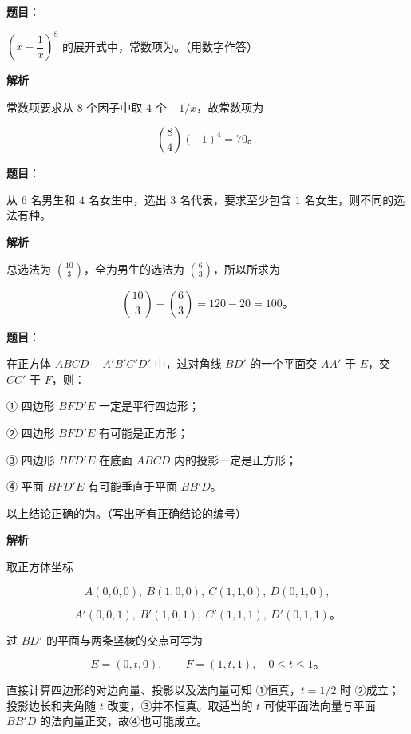 \begin{answer}

\textbf{题目}：

$\left(x-\dfrac1x\right)^8$ 的展开式中，常数项为\gkblank{}。（用数字作答）

\textbf{解析}

常数项要求从 $8$ 个因子中取 $4$ 个 $-1/x$，故常数项为

\nopagebreak[4]
\[
\binom84(-1)^4=70\text{。}
\]


\end{answer}
\begin{answer}

\textbf{题目}：

从 $6$ 名男生和 $4$ 名女生中，选出 $3$ 名代表，要求至少包含 $1$ 名女生，则不同的选法有\gkblank{}种。

\textbf{解析}

总选法为 $\binom{10}{3}$，全为男生的选法为 $\binom63$，所以所求为

\nopagebreak[4]
\[
\binom{10}{3}-\binom63=120-20=100\text{。}
\]


\end{answer}
\begin{answer}

\textbf{题目}：

在正方体 $ABCD-A'B'C'D'$ 中，过对角线 $BD'$ 的一个平面交 $AA'$ 于 $E$，交 $CC'$ 于 $F$，则：

① 四边形 $BFD'E$ 一定是平行四边形；

② 四边形 $BFD'E$ 有可能是正方形；

③ 四边形 $BFD'E$ 在底面 $ABCD$ 内的投影一定是正方形；

④ 平面 $BFD'E$ 有可能垂直于平面 $BB'D$。

以上结论正确的为\gkblank{}。（写出所有正确结论的编号）

\textbf{解析}

取正方体坐标

\nopagebreak[4]
\[
A(0,0,0),\ B(1,0,0),\ C(1,1,0),\ D(0,1,0),
\]

\nopagebreak[4]
\[
A'(0,0,1),\ B'(1,0,1),\ C'(1,1,1),\ D'(0,1,1)\text{。}
\]

过 $BD'$ 的平面与两条竖棱的交点可写为

\nopagebreak[4]
\[
E=(0,t,0),\qquad F=(1,t,1),\quad 0\leqslant t\leqslant1\text{。}
\]

直接计算四边形的对边向量、投影以及法向量可知 ①恒真，$t=1/2$ 时 ②成立；投影边长和夹角随 $t$ 改变，③并不恒真。取适当的 $t$ 可使平面法向量与平面 $BB'D$ 的法向量正交，故④也可能成立。


\end{answer}
